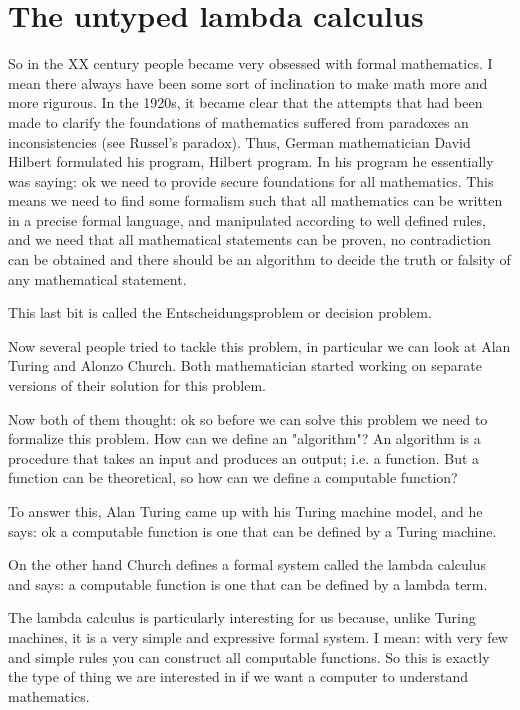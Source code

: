 \chapter{The untyped lambda calculus}

So in the XX century people became very obsessed with formal mathematics. I mean there always have been some sort of inclination to make math more and more rigurous. In the 1920s, it became clear that the attempts that had been made to clarify the foundations of mathematics suffered from paradoxes an inconsistencies (see Russel's paradox). Thus, German mathematician David Hilbert formulated his program, Hilbert program. In his program he essentially was saying: ok we need to provide secure foundations for all mathematics. This means we need to find some formalism such that all mathematics can be written in a precise formal language, and manipulated according to well defined rules, and we need that all mathematical statements can be proven, no contradiction can be obtained and there should be an algorithm to decide the truth or falsity of any mathematical statement.

This last bit is called the Entscheidungsproblem or decision problem. 

Now several people tried to tackle this problem, in particular we can look at Alan Turing and Alonzo Church. Both mathematician started working on separate versions of their solution for this problem.

Now both of them thought: ok so before we can solve this problem we need to formalize this problem. How can we define an "algorithm"? An algorithm is a procedure that takes an input and produces an output; i.e. a function. But a function can be theoretical, so how can we define a computable function?

To answer this, Alan Turing came up with his Turing machine model, and he says: ok a computable function is one that can be defined by a Turing machine.

On the other hand Church defines a formal system called the lambda calculus and says: a computable function is one that can be defined by a lambda term.

The lambda calculus is particularly interesting for us because, unlike Turing machines, it is a very simple and expressive formal system. I mean: with very few and simple rules you can construct all computable functions. So this is exactly the type of thing we are interested in if we want a computer to understand mathematics.

